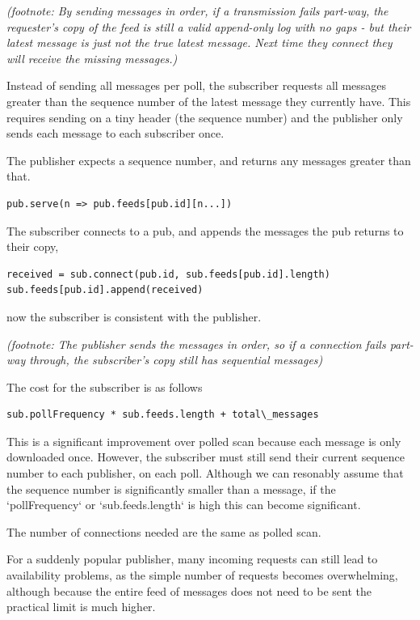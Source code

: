 \documentclass[sigconf]{acmart}
\begin{document}
{\em (footnote: By sending messages in order, if a transmission fails
  part-way, the requester's copy of the feed is still a valid
  append-only log with no gaps - but their latest message is just not
  the true latest message. Next time they connect they will receive
  the missing messages.)}

Instead of sending all messages per poll, the subscriber requests all
messages greater than the sequence number of the latest message they
currently have.  This requires sending on a tiny header (the sequence
number) and the publisher only sends each message to each subscriber
once.

The publisher expects a sequence number, and returns any messages
greater than that.
\begin{verbatim}
pub.serve(n => pub.feeds[pub.id][n...])
\end{verbatim}

The subscriber connects to a pub, and appends the messages the pub
returns to their copy,

\begin{verbatim}
received = sub.connect(pub.id, sub.feeds[pub.id].length)
sub.feeds[pub.id].append(received)
\end{verbatim}
now the subscriber is consistent with the publisher.

{\em (footnote: The publisher sends the messages in order, so if a
  connection fails part-way through, the subscriber's copy still has
  sequential messages)}

The cost for the subscriber is as follows

\begin{verbatim}
sub.pollFrequency * sub.feeds.length + total\_messages
\end{verbatim}

This is a significant improvement over polled scan because each
message is only downloaded once.  However, the subscriber must still
send their current sequence number to each publisher, on each poll.
Although we can resonably assume that the sequence number is
significantly smaller than a message, if the `pollFrequency` or
`sub.feeds.length` is high this can become significant.

The number of connections needed are the same as polled scan.

For a suddenly popular publisher, many incoming requests can still
lead to availability problems, as the simple number of requests
becomes overwhelming, although because the entire feed of messages
does not need to be sent the practical limit is much higher.
\end{document}
